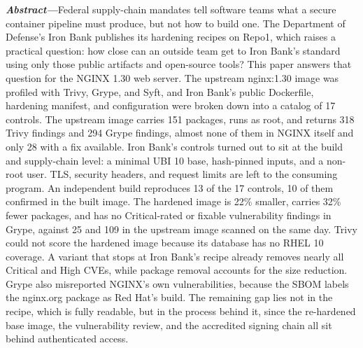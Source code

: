 \documentclass[10pt,letterpaper,twocolumn]{article}
\begin{document}

\noindent\textbf{\textit{Abstract---}}Federal supply-chain mandates tell software teams what a secure container pipeline must produce, but not how to build one. The Department of Defense's Iron Bank publishes its hardening recipes on Repo1, which raises a practical question: how close can an outside team get to Iron Bank's standard using only those public artifacts and open-source tools? This paper answers that question for the NGINX 1.30 web server. The upstream nginx:1.30 image was profiled with Trivy, Grype, and Syft, and Iron Bank's public Dockerfile, hardening manifest, and configuration were broken down into a catalog of 17 controls. The upstream image carries 151 packages, runs as root, and returns 318 Trivy findings and 294 Grype findings, almost none of them in NGINX itself and only 28 with a fix available. Iron Bank's controls turned out to sit at the build and supply-chain level: a minimal UBI 10 base, hash-pinned inputs, and a non-root user. TLS, security headers, and request limits are left to the consuming program. An independent build reproduces 13 of the 17 controls, 10 of them confirmed in the built image. The hardened image is 22\% smaller, carries 32\% fewer packages, and has no Critical-rated or fixable vulnerability findings in Grype, against 25 and 109 in the upstream image scanned on the same day. Trivy could not score the hardened image because its database has no RHEL 10 coverage. A variant that stops at Iron Bank's recipe already removes nearly all Critical and High CVEs, while package removal accounts for the size reduction. Grype also misreported NGINX's own vulnerabilities, because the SBOM labels the nginx.org package as Red Hat's build. The remaining gap lies not in the recipe, which is fully readable, but in the process behind it, since the re-hardened base image, the vulnerability review, and the accredited signing chain all sit behind authenticated access.
\end{document}
